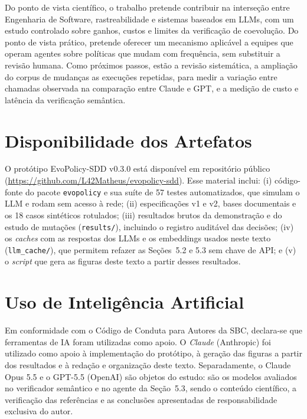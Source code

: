 \documentclass[12pt]{article}
\newcommand{\code}[1]{\texttt{#1}}
\begin{document}
Do ponto de vista científico, o trabalho pretende contribuir na interseção entre Engenharia de Software, rastreabilidade e sistemas baseados em LLMs, com um estudo controlado sobre ganhos, custos e limites da verificação de coevolução. Do ponto de vista prático, pretende oferecer um mecanismo aplicável a equipes que operam agentes sobre políticas que mudam com frequência, sem substituir a revisão humana. Como próximos passos, estão a revisão sistemática, a ampliação do corpus de mudanças as execuções repetidas, para medir a variação entre chamadas observada na comparação entre Claude e GPT, e a medição de custo e latência da verificação semântica.

\section*{Disponibilidade dos Artefatos}
{
\small
O protótipo EvoPolicy-SDD v0.3.0 está disponível em repositório público (\url{https://github.com/L42Matheus/evopolicy-sdd}). Esse material inclui: (i) código-fonte do pacote \code{evopolicy} e sua suíte de 57 testes automatizados, que simulam o LLM e rodam sem acesso à rede; (ii) especificações v1 e v2, bases documentais e os 18 casos sintéticos rotulados; (iii) resultados brutos da demonstração e do estudo de mutações (\code{results/}), incluindo o registro auditável das decisões; (iv) os \textit{caches} com as respostas dos LLMs e os embeddings usados neste texto (\code{llm\_cache/}), que permitem refazer as Seções~5.2 e 5.3 sem chave de API; e (v) o \textit{script} que gera as figuras deste texto a partir desses resultados.
}

\section*{Uso de Inteligência Artificial}
\label{Sec:IA}
{
\small
Em conformidade com o Código de Conduta para Autores da SBC, declara-se que ferramentas de IA foram utilizadas como apoio. O \textit{Claude} (Anthropic) foi utilizado como apoio à implementação do protótipo, à geração das figuras a partir dos resultados e à redação e organização deste texto. Separadamente, o Claude Opus 5.5 e o GPT-5.5 (OpenAI) são objetos do estudo: são os modelos avaliados no verificador semântico e no agente da Seção~5.3, sendo o conteúdo científico, a verificação das referências e as conclusões apresentadas de responsabilidade exclusiva do autor.
}



\end{document}
